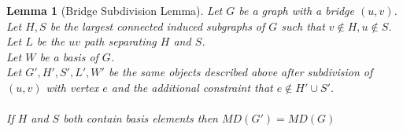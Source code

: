 \documentclass[11pt]{amsart}
\theoremstyle{plain}  %
\newtheorem{lem}[thm]{Lemma}
\theoremstyle{definition}
\theoremstyle{remark}
\numberwithin{equation}{thm}
\begin{document}
\begin{lem}[Bridge Subdivision Lemma]
 Let $G$ be a graph with a bridge $(u,v)$.\\
 Let $H, S$ be the largest connected induced subgraphs of $G$ such that $v\notin H, u\notin S$.\\
 Let $L$ be the $uv$ path separating $H$ and $S$.\\
 Let $W$ be a basis of $G$.\\
 Let $G', H', S', L', W'$ be the same objects described above after subdivision of $(u,v)$ with vertex $e$ and the additional constraint that
 $e \notin H' \cup S'$.\\
 \\
 If $H$ and $S$ both contain basis elements then $MD(G') = MD(G)$
\end{lem}
\end{document}
